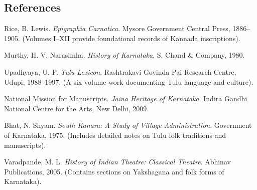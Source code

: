 \documentclass[12pt]{article}
\begin{document}
\subsection*{References}
\begin{enumerate}[label={[\arabic*]}]
    \item Rice, B. Lewis. \textit{Epigraphia Carnatica}. Mysore Government Central Press, 1886–1905. (Volumes I–XII provide foundational records of Kannada inscriptions).
    \item Murthy, H. V. Narasimha. \textit{History of Karnataka}. S. Chand \& Company, 1980.
    \item Upadhyaya, U. P. \textit{Tulu Lexicon}. Rashtrakavi Govinda Pai Research Centre, Udupi, 1988–1997. (A six-volume work documenting Tulu language and culture).
    \item National Mission for Manuscripts. \textit{Jaina Heritage of Karnataka}. Indira Gandhi National Centre for the Arts, New Delhi, 2009.
    \item Bhat, N. Shyam. \textit{South Kanara: A Study of Village Administration}. Government of Karnataka, 1975. (Includes detailed notes on Tulu folk traditions and manuscripts).
    \item Varadpande, M. L. \textit{History of Indian Theatre: Classical Theatre}. Abhinav Publications, 2005. (Contains sections on Yakshagana and folk forms of Karnataka).
\end{enumerate}
\end{document}
